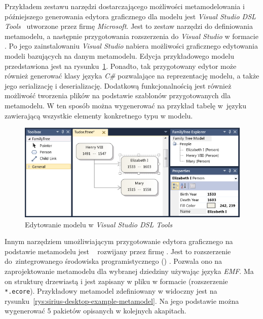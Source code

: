Przykładem zestawu narzędzi dostarczającego możliwości metamodelowania i
późniejszego generowania edytora graficznego dla modelu jest \emph{Visual
	Studio DSL Tools}~\cite{visual-studio-dsl-introduction} utworzone przez
firmę \emph{Microsoft}. Jest to zestaw
narzędzi do definiowania metamodelu, a następnie przygotowania rozszerzenia do
\emph{Visual Studio} w formacie . Po jego zainstalowaniu
\emph{Visual Studio} nabiera możliwości graficznego edytowania modeli
bazujących na danym metamodelu. Edycja przykładowego modelu przedstawiona jest
na rysunku~\ref{rys:visual-studio-dsl-example}. Ponadto, tak przygotowany
edytor
może również generować klasy języka \emph{C\#} pozwalające na reprezentację
modelu, a
także jego serializację i deserializację. Dodatkową funkcjonalnością jest
również możliwość tworzenia plików na podstawie szablonów przygotowanych dla
metamodelu. W ten sposób można wygenerować na przykład tabelę w~języku
 zawierającą wszystkie elementy konkretnego typu w modelu.

\begin{figure}[!ht]
	\centering

	\includegraphics[width=0.95\linewidth]{./images/visual-studio-dsl-example.png}
	\caption{Edytowanie modelu w \emph{Visual Studio DSL
			Tools}}\label{rys:visual-studio-dsl-example}
\end{figure}

Innym narzędziem umożliwiającym przygotowanie edytora graficznego na podstawie
metamodelu jest \SiriusDesktop{}~\cite{sirius-desktop-homepage} rozwijany
przez firmę \Eclipse{}. Jest to rozszerzenie do~zintegrowanego środowiska
programistycznego () \Eclipse{}. Pozwala ono na zaprojektowanie
metamodelu dla wybranej dziedziny używając języka \emph{\acrfull{EMF}}. Ma on
strukturę drzewiastą i jest
zapisany w pliku  w formacie \Ecore{} (rozszerzenie
\texttt{*.ecore}). Przykładowy metamodel zdefiniowany w \SiriusDesktop{}
widoczny jest na rysunku~\ref{rys:sirius-desktop-example-metamodel}. Na jego
podstawie można wygenerować 5 pakietów opisanych w kolejnych akapitach.

